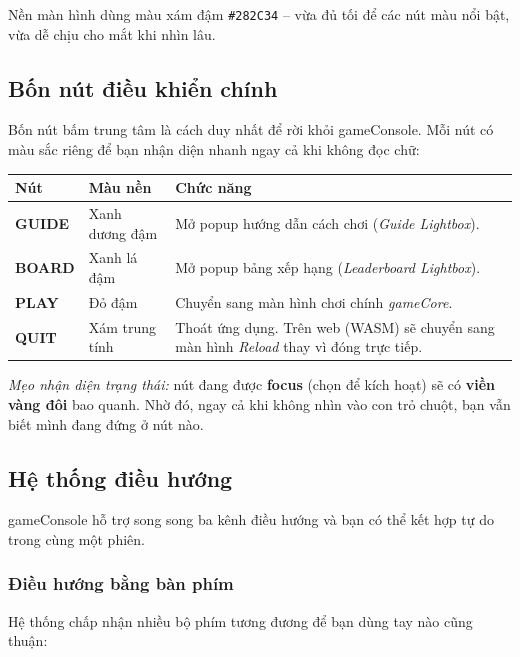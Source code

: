\documentclass[12pt,a4paper]{article}
\begin{document}
\noindent Nền màn hình dùng màu xám đậm \texttt{\#282C34} -- vừa đủ tối để các nút màu nổi bật, vừa dễ chịu cho mắt khi nhìn lâu.

\subsection{Bốn nút điều khiển chính}
Bốn nút bấm trung tâm là cách duy nhất để rời khỏi gameConsole. Mỗi nút có màu sắc riêng để bạn nhận diện nhanh ngay cả khi không đọc chữ:

\vspace{4pt}
\begin{tabularx}{\linewidth}{|l|l|X|}
    \hline
    \textbf{Nút} & \textbf{Màu nền} & \textbf{Chức năng} \\
    \hline
    \textbf{GUIDE} & Xanh dương đậm & Mở popup hướng dẫn cách chơi (\textit{Guide Lightbox}). \\
    \hline
    \textbf{BOARD} & Xanh lá đậm   & Mở popup bảng xếp hạng (\textit{Leaderboard Lightbox}). \\
    \hline
    \textbf{PLAY}  & Đỏ đậm        & Chuyển sang màn hình chơi chính \textit{gameCore}. \\
    \hline
    \textbf{QUIT}  & Xám trung tính & Thoát ứng dụng. Trên web (WASM) sẽ chuyển sang màn hình \textit{Reload} thay vì đóng trực tiếp. \\
    \hline
\end{tabularx}

\vspace{4pt}
\noindent\textit{Mẹo nhận diện trạng thái:} nút đang được \textbf{focus} (chọn để kích hoạt) sẽ có \textbf{viền vàng đôi} bao quanh. Nhờ đó, ngay cả khi không nhìn vào con trỏ chuột, bạn vẫn biết mình đang đứng ở nút nào.

\subsection{Hệ thống điều hướng}
gameConsole hỗ trợ song song ba kênh điều hướng và bạn có thể kết hợp tự do trong cùng một phiên.

\subsubsection{Điều hướng bằng bàn phím}
Hệ thống chấp nhận nhiều bộ phím tương đương để bạn dùng tay nào cũng thuận:
\end{document}
